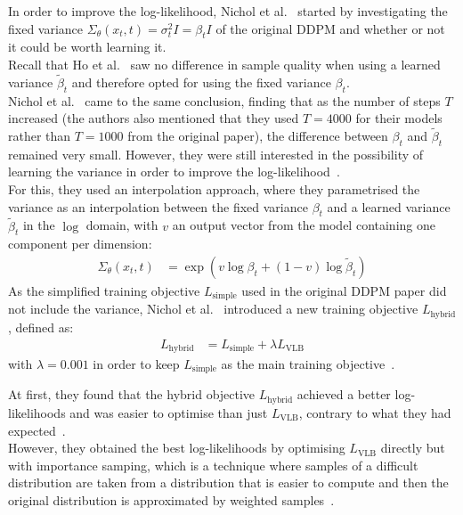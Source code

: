 \documentclass[twoside]{article}
\numberwithin{equation}{section}
\numberwithin{figure}{section}
\begin{document}
In order to improve the log-likelihood, Nichol et al.~\cite{nichol2021improved} started by investigating the fixed variance $\Sigma_\theta (x_t, t) = \sigma_t^2 I = \beta_t I$ of the original DDPM and whether or not it could be worth learning it. \\
Recall that Ho et al.~\cite{ho2020denoising} saw no difference in sample quality when using a learned variance $\tilde{\beta}_t$ and therefore opted for using the fixed variance $\beta_t$. \\
Nichol et al.~\cite{nichol2021improved} came to the same conclusion, finding that as the number of steps $T$ increased (the authors also mentioned that they used $T = 4000$ for their models rather than $T = 1000$ from the original paper), the difference between $\beta_t$ and $\tilde{\beta}_t$ remained very small. However, they were still interested in the possibility of learning the variance in order to improve the log-likelihood~\cite{nichol2021improved}. \\
For this, they used an interpolation approach, where they parametrised the variance as an interpolation between the fixed variance $\beta_t$ and a learned variance $\tilde{\beta}_t$ in the $\log$ domain, with $v$ an output vector from the model containing one component per dimension:
\begin{align}
  \Sigma_\theta (x_t, t) &= \exp \left( v \log \beta_t + (1 - v) \log \tilde{\beta}_t \right)
\end{align}
As the simplified training objective $L_{\text{simple}}$ used in the original DDPM paper \cite{ho2020denoising} did not include the variance, Nichol et al.~\cite{nichol2021improved} introduced a new training objective $L_{\text{hybrid}}$, defined as:
\begin{align}
  L_{\text{hybrid}} &= L_{\text{simple}} + \lambda L_{\text{VLB}}
\end{align}
with $\lambda = 0.001$ in order to keep $L_{\text{simple}}$ as the main training objective~\cite{nichol2021improved}.

At first, they found that the hybrid objective $L_{\text{hybrid}}$ achieved a better log-likelihoods and was easier to optimise than just $L_{\text{VLB}}$, contrary to what they had expected~\cite{nichol2021improved}. \\
However, they obtained the best log-likelihoods by optimising $L_{\text{VLB}}$ directly but with importance samping, which is a technique where samples of a difficult distribution are taken from a distribution that is easier to compute and then the original distribution is approximated by weighted samples~\cite{nichol2021improved}.
\end{document}

